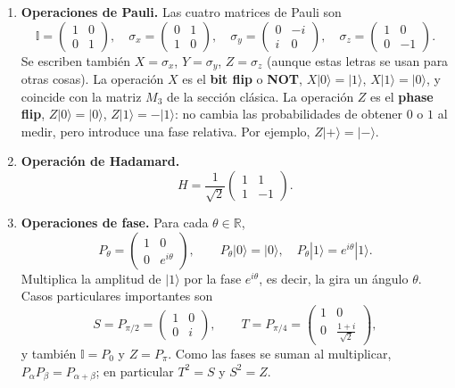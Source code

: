 \documentclass[11pt, a4paper, twoside, openright]{report}
\begin{document}
\begin{enumerate}
    \item \textbf{Operaciones de Pauli.} Las cuatro matrices de Pauli son
    \[
    \mathbb{I} = \begin{pmatrix} 1 & 0 \\ 0 & 1 \end{pmatrix}, \quad
    \sigma_x = \begin{pmatrix} 0 & 1 \\ 1 & 0 \end{pmatrix}, \quad
    \sigma_y = \begin{pmatrix} 0 & -i \\ i & 0 \end{pmatrix}, \quad
    \sigma_z = \begin{pmatrix} 1 & 0 \\ 0 & -1 \end{pmatrix}.
    \]
    Se escriben también $X = \sigma_x$, $Y = \sigma_y$, $Z = \sigma_z$ (aunque estas letras se usan para otras cosas). La operación $X$ es el \textbf{bit flip} o \textbf{NOT}, $X|0\rangle = |1\rangle$, $X|1\rangle = |0\rangle$, y coincide con la matriz $M_3$ de la sección clásica. La operación $Z$ es el \textbf{phase flip}, $Z|0\rangle = |0\rangle$, $Z|1\rangle = -|1\rangle$: no cambia las probabilidades de obtener $0$ o $1$ al medir, pero introduce una fase relativa. Por ejemplo, $Z|+\rangle = |-\rangle$.

    \item \textbf{Operación de Hadamard.}
    \[ H = \frac{1}{\sqrt 2}\begin{pmatrix} 1 & 1 \\ 1 & -1 \end{pmatrix}. \]

    \item \textbf{Operaciones de fase.} Para cada $\theta \in \mathbb{R}$,
    \[ P_\theta = \begin{pmatrix} 1 & 0 \\ 0 & e^{i\theta} \end{pmatrix}, \qquad P_\theta|0\rangle = |0\rangle, \quad P_\theta|1\rangle = e^{i\theta}|1\rangle. \]
    Multiplica la amplitud de $|1\rangle$ por la fase $e^{i\theta}$, es decir, la gira un ángulo $\theta$. Casos particulares importantes son
    \[ S = P_{\pi/2} = \begin{pmatrix} 1 & 0 \\ 0 & i \end{pmatrix}, \qquad T = P_{\pi/4} = \begin{pmatrix} 1 & 0 \\ 0 & \frac{1+i}{\sqrt 2} \end{pmatrix}, \]
    y también $\mathbb{I} = P_0$ y $Z = P_\pi$. Como las fases se suman al multiplicar, $P_\alpha P_\beta = P_{\alpha+\beta}$; en particular $T^2 = S$ y $S^2 = Z$.
\end{enumerate}
\end{document}
